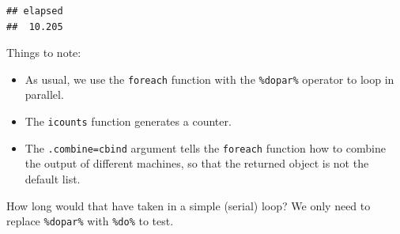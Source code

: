 \documentclass[]{book}
\newenvironment{Shaded}{\begin{snugshade}}{\end{snugshade}}
\newcommand{\KeywordTok}[1]{\textcolor[rgb]{0.13,0.29,0.53}{\textbf{#1}}}
\newcommand{\DataTypeTok}[1]{\textcolor[rgb]{0.13,0.29,0.53}{#1}}
\newcommand{\DecValTok}[1]{\textcolor[rgb]{0.00,0.00,0.81}{#1}}
\newcommand{\FloatTok}[1]{\textcolor[rgb]{0.00,0.00,0.81}{#1}}
\newcommand{\StringTok}[1]{\textcolor[rgb]{0.31,0.60,0.02}{#1}}
\newcommand{\OtherTok}[1]{\textcolor[rgb]{0.56,0.35,0.01}{#1}}
\newcommand{\OperatorTok}[1]{\textcolor[rgb]{0.81,0.36,0.00}{\textbf{#1}}}
\newcommand{\NormalTok}[1]{#1}
\providecommand{\tightlist}{%
  \setlength{\itemsep}{0pt}\setlength{\parskip}{0pt}}
\theoremstyle{definition}
\theoremstyle{definition}
\theoremstyle{definition}
\theoremstyle{remark}
\begin{document}
\begin{Shaded}
\end{Shaded}

\begin{verbatim}
## elapsed 
##  10.205
\end{verbatim}

Things to note:

\begin{itemize}
\tightlist
\item
  As usual, we use the \texttt{foreach} function with the
  \texttt{\%dopar\%} operator to loop in parallel.
\item
  The \texttt{icounts} function generates a counter.
\item
  The \texttt{.combine=cbind} argument tells the \texttt{foreach}
  function how to combine the output of different machines, so that the
  returned object is not the default list.
\end{itemize}

How long would that have taken in a simple (serial) loop? We only need
to replace \texttt{\%dopar\%} with \texttt{\%do\%} to test.
\end{document}
